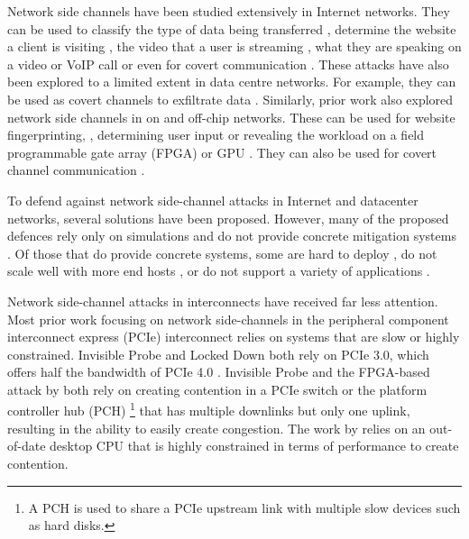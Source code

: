 Network side channels have been studied extensively in Internet networks.
They can be used to classify the type of data being transferred \cite{shapira2019flowpic}, determine the website a client is visiting \cite{bhat2019varcnn, dyer2012peek, hayes2016kfp, sirinam2018df}, the video that a user is streaming \cite{schuster2017beautyburst}, what they are speaking on a video or VoIP call \cite{white2011phonotactic} or even for covert communication \cite{barradas2020poking}.
These attacks have also been explored to a limited extent in data centre networks.
For example, they can be used as covert channels to exfiltrate data \cite{tahir2016sneak}.
Similarly, prior work also explored network side channels in on and off-chip networks. 
These can be used for website fingerprinting, \cite{tan2021invisible, side2022lockeddown}, determining user input \cite{tan2021invisible, rodrigues2024busted} or revealing the workload on a field programmable gate array (FPGA) or GPU \cite{tan2021invisible, giechaskiel2022cross, fang2023gotcha}.
They can also be used for covert channel communication \cite{khaliq2021timing, giechaskiel2022cross, side2022lockeddown, dutta2023spy}.

To defend against network side-channel attacks in Internet and datacenter networks, several solutions have been proposed. 
However, many of the proposed defences rely only on simulations and do not provide concrete mitigation systems \cite{abusnaina2020dfd, cai2014tamaraw, gong2022surakav, hou2020wf, juarez2016wtfpad, nasr2021blind, rahman2020mockingbird, shan2021dolos, wang2014supersequence, wright2009morphing}.
Of those that do provide concrete systems, some are hard to deploy \cite{cai2014csbuflo, mehta2022pacer, smith2022qcsd, wang2017walkie}, do not scale well with more end hosts \cite{luo2011httpos, cai2014csbuflo, smith2022qcsd, wang2017walkie, cherubin2017llama, barradas2017deltashaper}, or do not support a variety of applications \cite{luo2011httpos, wang2017walkie, cherubin2017llama}.


Network side-channel attacks in interconnects have received far less attention.
Most prior work focusing on network side-channels in the peripheral component interconnect express (PCIe) interconnect relies on systems that are slow or highly constrained.
Invisible Probe \cite{tan2021invisible} and Locked Down \cite{side2022lockeddown} both rely on PCIe 3.0, which offers half the bandwidth of PCIe 4.0 \cite{pcie_3_v_4}.
Invisible Probe \cite{tan2021invisible} and the FPGA-based attack by \citet{giechaskiel2022cross} both rely on creating contention in a PCIe switch or the platform controller hub (PCH) 
\footnote{A PCH is used to share a PCIe upstream link with multiple slow devices such as hard disks.}
that has multiple downlinks but only one uplink, resulting in the ability to easily create congestion.
The work by \citet{khaliq2021timing} relies on an out-of-date desktop CPU that is highly constrained in terms of performance to create contention.

